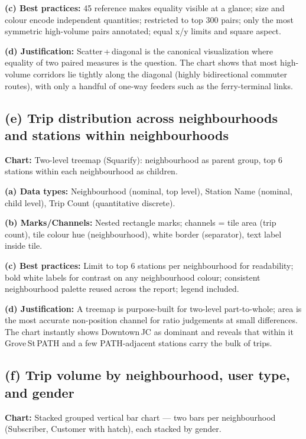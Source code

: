 \documentclass[11pt, a4paper]{article}
\begin{document}
\textbf{(c) Best practices:} 45\textdegree{} reference makes equality visible at a glance; size and colour encode independent quantities; restricted to top 300 pairs; only the most symmetric high-volume pairs annotated; equal x/y limits and square aspect.

\textbf{(d) Justification:} Scatter\,+\,diagonal is the canonical visualization where equality of two paired measures is the question. The chart shows that most high-volume corridors lie tightly along the diagonal (highly bidirectional commuter routes), with only a handful of one-way feeders such as the ferry-terminal links.


\subsection{(e) Trip distribution across neighbourhoods and stations within neighbourhoods}
\textbf{Chart:} Two-level treemap (Squarify): neighbourhood as parent group, top 6 stations within each neighbourhood as children.

\textbf{(a) Data types:} Neighbourhood (nominal, top level), Station Name (nominal, child level), Trip Count (quantitative discrete).

\textbf{(b) Marks/Channels:} Nested rectangle marks; channels = tile area (trip count), tile colour hue (neighbourhood), white border (separator), text label inside tile.

\textbf{(c) Best practices:} Limit to top 6 stations per neighbourhood for readability; bold white labels for contrast on any neighbourhood colour; consistent neighbourhood palette reused across the report; legend included.

\textbf{(d) Justification:} A treemap is purpose-built for two-level part-to-whole; area is the most accurate non-position channel for ratio judgements at small differences. The chart instantly shows Downtown\,JC as dominant and reveals that within it Grove\,St\,PATH and a few PATH-adjacent stations carry the bulk of trips.

\subsection{(f) Trip volume by neighbourhood, user type, and gender}
\textbf{Chart:} Stacked grouped vertical bar chart --- two bars per neighbourhood (Subscriber, Customer with hatch), each stacked by gender.
\end{document}
